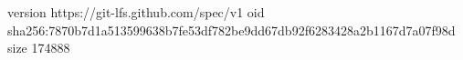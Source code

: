 version https://git-lfs.github.com/spec/v1
oid sha256:7870b7d1a513599638b7fe53df782be9dd67db92f6283428a2b1167d7a07f98d
size 174888

